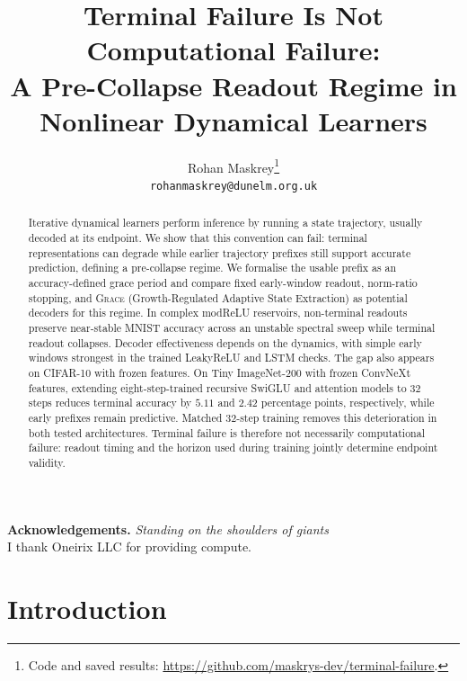 \documentclass{article}
\title{Terminal Failure Is Not Computational Failure:\\
A Pre-Collapse Readout Regime in Nonlinear Dynamical Learners}
\author{Rohan Maskrey\thanks{Code and saved results:
  \url{https://github.com/maskrys-dev/terminal-failure}.} \\
  \texttt{rohanmaskrey@dunelm.org.uk}}
\theoremstyle{remark}
\newcommand{\grace}{\textnormal{\textsc{Grace}}}
\begin{document}
\raggedbottom

\maketitle

\begin{center}
\small
\textbf{Acknowledgements.} \textit{Standing on the shoulders of giants}
\\ I thank Oneirix LLC for providing compute.
\end{center}


\begin{abstract}
\frenchspacing
Iterative dynamical learners perform inference by running a state trajectory,
usually decoded at its endpoint. We show that this convention can fail:
terminal representations can degrade while earlier trajectory prefixes still
support accurate prediction, defining a pre-collapse regime. We formalise the usable prefix as an
accuracy-defined grace period and compare fixed early-window readout,
norm-ratio stopping, and \grace{} (Growth-Regulated Adaptive State Extraction)
as potential decoders for this regime.
In complex modReLU reservoirs, non-terminal readouts preserve near-stable
MNIST accuracy across an unstable spectral sweep while terminal readout
collapses. Decoder effectiveness depends on the dynamics, with simple early
windows strongest in the trained LeakyReLU and LSTM checks. The gap also
appears on CIFAR-10 with frozen features. On Tiny ImageNet-200 with frozen
ConvNeXt features, extending eight-step-trained recursive SwiGLU and attention
models to 32 steps reduces terminal accuracy by $5.11$ and $2.42$ percentage
points, respectively, while early prefixes remain predictive. Matched 32-step
training removes this deterioration in both tested architectures. Terminal
failure is therefore not necessarily computational failure: readout timing
and the horizon used during training jointly determine endpoint validity.
\end{abstract}


\section{Introduction}
\label{sec:intro}
\end{document}
